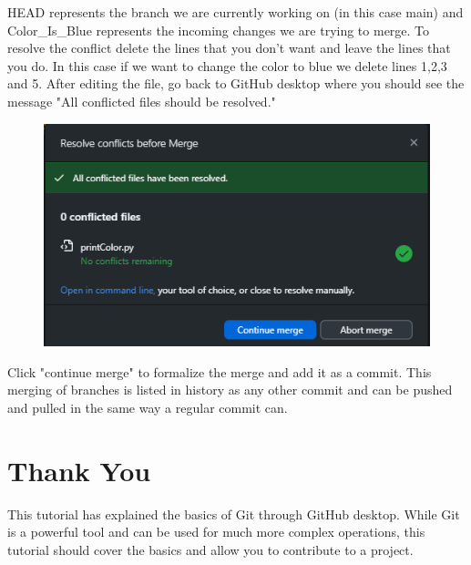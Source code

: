 \documentclass{article}
\begin{document}
    HEAD represents the branch we are currently working on (in this case main) and Color_Is_Blue represents the incoming changes we are trying to merge. To resolve the conflict delete the lines that you don't want and leave the lines that you do. In this case if we want to change the color to blue we delete lines 1,2,3 and 5. After editing the file, go back to GitHub desktop where you should see the message "All conflicted files should be resolved."
    \begin{figure}
        \centering
        \includegraphics[width=0.5\linewidth]{FilesResolved.png}
    \end{figure}
    Click "continue merge" to formalize the merge and add it as a commit. This merging of branches is listed in history as any other commit and can be pushed and pulled in the same way a regular commit can.

\section{Thank You}

    This tutorial has explained the basics of Git through GitHub desktop. While Git is a powerful tool and can be used for much more complex operations, this tutorial should cover the basics and allow you to contribute to a project.
\end{document}

